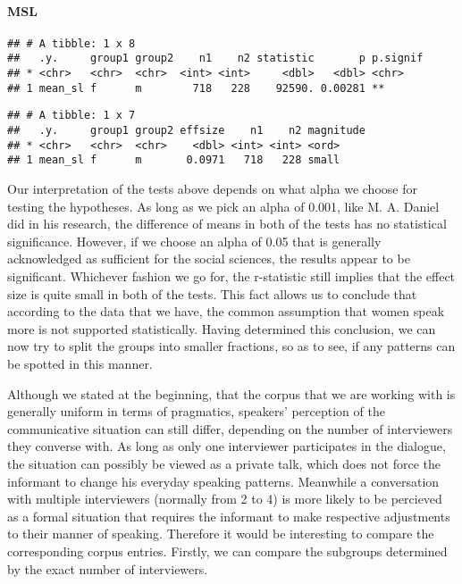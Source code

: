 \documentclass[
]{article}
\begin{document}
\hypertarget{msl}{%
\paragraph{MSL}\label{msl}}

\begin{verbatim}
## # A tibble: 1 x 8
##   .y.     group1 group2    n1    n2 statistic       p p.signif
## * <chr>   <chr>  <chr>  <int> <int>     <dbl>   <dbl> <chr>   
## 1 mean_sl f      m        718   228    92590. 0.00281 **
\end{verbatim}

\begin{verbatim}
## # A tibble: 1 x 7
##   .y.     group1 group2 effsize    n1    n2 magnitude
## * <chr>   <chr>  <chr>    <dbl> <int> <int> <ord>    
## 1 mean_sl f      m       0.0971   718   228 small
\end{verbatim}

Our interpretation of the tests above depends on what alpha we choose
for testing the hypotheses. As long as we pick an alpha of 0.001, like
M. A. Daniel did in his research, the difference of means in both of the
tests has no statistical significance. However, if we choose an alpha of
0.05 that is generally acknowledged as sufficient for the social
sciences, the results appear to be significant. Whichever fashion we go
for, the r-statistic still implies that the effect size is quite small
in both of the tests. This fact allows us to conclude that according to
the data that we have, the common assumption that women speak more is
not supported statistically. Having determined this conclusion, we can
now try to split the groups into smaller fractions, so as to see, if any
patterns can be spotted in this manner.

Although we stated at the beginning, that the corpus that we are working
with is generally uniform in terms of pragmatics, speakers' perception
of the communicative situation can still differ, depending on the number
of interviewers they converse with. As long as only one interviewer
participates in the dialogue, the situation can possibly be viewed as a
private talk, which does not force the informant to change his everyday
speaking patterns. Meanwhile a conversation with multiple interviewers
(normally from 2 to 4) is more likely to be percieved as a formal
situation that requires the informant to make respective adjustments to
their manner of speaking. Therefore it would be interesting to compare
the corresponding corpus entries. Firstly, we can compare the subgroups
determined by the exact number of interviewers.
\end{document}
